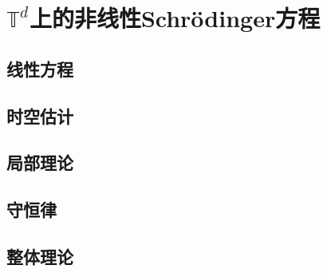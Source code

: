 \documentclass{ctexbook}
\theoremstyle{definition}
\theoremstyle{remark}
\begin{document}
\chapter{$\mathbb{T}^d$上的非线性Schr\"odinger方程}
\section{线性方程}
\section{时空估计}
\section{局部理论}
\section{守恒律}
\section{整体理论}
\end{document}
